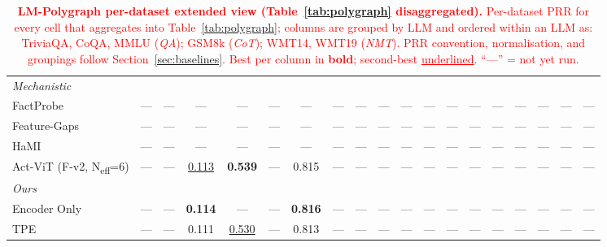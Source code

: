 \begin{table}[!t]
{\begin{tabular}{l *{6}{c} *{6}{c} *{6}{c}}
\midrule
\multicolumn{19}{l}{\textit{Mechanistic}} \\
\cmidrule(l){1-19}
FactProbe
  & --- & --- & ---   & ---   & --- & ---
  & --- & --- & ---   & ---   & --- & ---
  & --- & --- & ---   & ---   & --- & --- \\
Feature-Gaps
  & --- & --- & ---   & ---   & --- & ---
  & --- & --- & ---   & ---   & --- & ---
  & --- & --- & ---   & ---   & --- & --- \\
HaMI
  & --- & --- & ---   & ---   & --- & ---
  & --- & --- & ---   & ---   & --- & ---
  & --- & --- & ---   & ---   & --- & --- \\
Act-ViT (F-v2, N\textsubscript{eff}=6)
  & --- & --- & \underline{0.113} & \textbf{0.539} & --- & 0.815
  & --- & --- & ---   & ---   & --- & ---
  & --- & --- & ---   & ---   & --- & --- \\
\midrule
\multicolumn{19}{l}{\textit{Ours}} \\
\cmidrule(l){1-19}
Encoder Only  & --- & --- & \textbf{0.114} & ---   & --- & \textbf{0.816}
  & --- & --- & ---   & ---   & --- & ---
  & --- & --- & ---   & ---   & --- & --- \\
TPE  & --- & --- & 0.111 & \underline{0.530} & --- & 0.813
  & --- & --- & ---   & ---   & --- & ---
  & --- & --- & ---   & ---   & --- & --- \\
\bottomrule
\end{tabular}%
}
\caption{\textcolor{red}{\textbf{LM-Polygraph per-dataset extended view
(Table~\ref{tab:polygraph} disaggregated).} Per-dataset PRR for every cell
that aggregates into Table~\ref{tab:polygraph}; columns are grouped by LLM
and ordered within an LLM as: TriviaQA, CoQA, MMLU (\emph{QA}); GSM8k
(\emph{CoT}); WMT14, WMT19 (\emph{NMT}). PRR convention, normalisation, and
groupings follow Section~\ref{sec:baselines}. Best per column in
\textbf{bold}; second-best \underline{underlined}. ``---'' = not yet run.}}
\label{tab:polygraph_extended}
\end{table}
